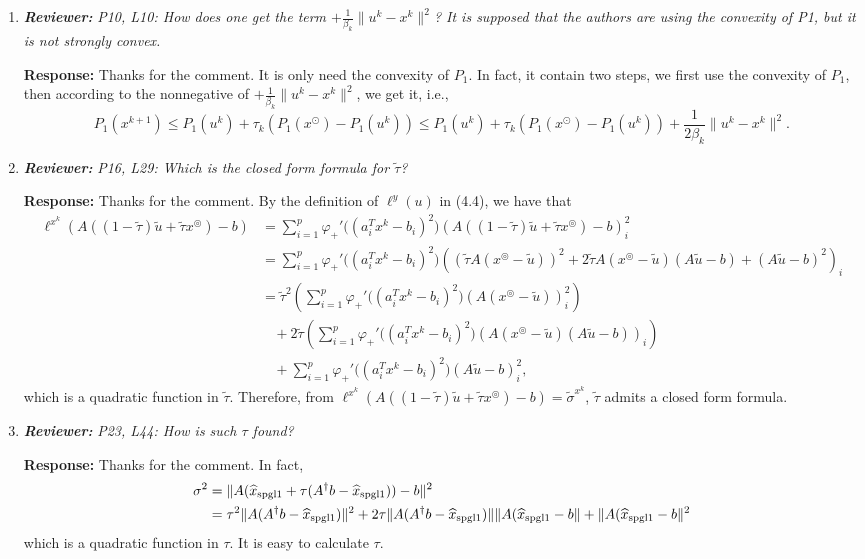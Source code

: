 \documentclass{article}
\begin{document}
\begin{enumerate}
	\item  \textit{\textbf{Reviewer:}} \textit{P10, L10: How does one get the term $+\frac{1}{\beta_k}\|u^k - x^k\|^2$? It is supposed that the authors are using the convexity of P1, but it is not strongly convex.}
	
	\textbf{Response:} Thanks for the comment. It is only need the convexity of $P_1$. In fact, it contain two steps, we first use the convexity of $P_1$, then according to the nonnegative of $+\frac{1}{\beta_k}\|u^k - x^k\|^2$, we get it, i.e.,
\[
P_1(x^{k+1})\leq P_1(u^k) + \tau_k(P_1(x^\odot) - P_1(u^k))\leq P_1(u^k) + \tau_k(P_1(x^\odot) - P_1(u^k)) + \frac{1}{2\beta_k}\|u^k - x^k\|^2.
\]

	\item  \textit{\textbf{Reviewer:}} \textit{P16, L29: Which is the closed form formula for $\tilde{\tau}$?}
	
	\textbf{Response:} Thanks for the comment. By the definition of $\ell^{y}(u)$ in (4.4), we have that
\begin{equation*}
\begin{aligned}
\ell^{x^k}(A((1-\widetilde\tau)\widetilde u + \widetilde\tau x^\circledcirc) - b) &= \sum_{i=1}^p\varphi_+'\big((a_i^T x^k - b_i)^2\big)(A((1-\widetilde\tau)\widetilde u + \widetilde\tau x^\circledcirc) - b)_i^2\\
& = \sum_{i=1}^p\varphi_+'\big((a_i^T x^k - b_i)^2\big)((\widetilde\tau A(x^\circledcirc - \widetilde u))^2 + 2\widetilde\tau A(x^\circledcirc - \widetilde u)(A\widetilde u - b) + (A\widetilde u - b)^2)_i\\
&= \widetilde\tau^2(\sum_{i=1}^p\varphi_+'\big((a_i^T x^k - b_i)^2\big)(A(x^\circledcirc - \widetilde u))_i^2) \\
&~~~~+ 2\widetilde\tau (\sum_{i=1}^p\varphi_+'\big((a_i^T x^k - b_i)^2\big)(A(x^\circledcirc - \widetilde u)(A\widetilde u - b))_i) \\
&~~~~+ \sum_{i=1}^p\varphi_+'\big((a_i^T x^k - b_i)^2\big)(A\widetilde u - b)^2_i,
\end{aligned}
\end{equation*}
which is a quadratic function in $\widetilde\tau$. Therefore, from $\ell^{x^k}(A((1-\widetilde\tau)\widetilde u + \widetilde\tau x^\circledcirc) - b) = \tilde{\sigma}^{x^k}$, $\widetilde\tau$ admits a closed form formula.
	\item  \textit{\textbf{Reviewer:}} \textit{P23, L44: How is such $\tau$ found?}
	
	\textbf{Response:} Thanks for the comment. In fact,
\begin{equation*}
\begin{aligned}
\sigma^2 &= \|A(\widehat x_{\rm spgl1} + \tau(A^\dagger b - \widehat x_{\rm spgl1})) - b\|^2\\
 &=\tau^2\|A(A^\dagger b - \widehat x_{\rm spgl1})\|^2 + 2\tau\|A(A^\dagger b - \widehat x_{\rm spgl1})\|\|A(\widehat x_{\rm spgl1} - b\| + \|A(\widehat x_{\rm spgl1} - b\|^2
\end{aligned}
\end{equation*}
which is a quadratic function in $\tau$. It is easy to calculate $\tau$.



\end{enumerate}
\end{document}
